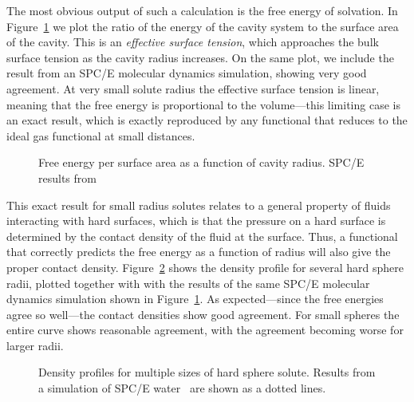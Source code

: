 \documentclass[letterpaper,twocolumn,amsmath,amssymb,prb]{revtex4-1}
\begin{document}
The most obvious output of such a calculation is the free energy of
solvation.  In Figure~\ref{fig:surfaceTension} we plot the ratio of the
energy of the cavity system to the surface area of the cavity.  This
is an \emph{effective surface tension}, which approaches the bulk
surface tension as the cavity radius increases.  On the same plot, we
include the result from an SPC/E molecular dynamics
simulation\cite{huang2001shs}, showing very good agreement.  At very
small solute radius the effective surface tension is linear, meaning
that the free energy is proportional to the volume---this limiting
case is an exact result, which is exactly reproduced by any functional
that reduces to the ideal gas functional at small distances.

\begin{figure}
\begin{center}
\end{center}
\caption{Free energy per surface area as a function of cavity
  radius. SPC/E results from~\cite{huang2001shs}}
\label{fig:surfaceTension}
\end{figure}

This exact result for small radius solutes relates to a general property of
fluids interacting with hard surfaces, which is that the pressure on a hard
surface is determined by the contact density of the fluid at the surface.
Thus, a functional that correctly predicts the free energy as a function of
radius will also give the proper contact density.
Figure~\ref{fig:cavities} shows the density profile for several hard sphere
radii, plotted together with with the results of the same SPC/E molecular
dynamics simulation shown in
Figure~\ref{fig:surfaceTension}\cite{huang2001shs}.  As expected---since
the free energies agree so well---the contact densities show good
agreement.  For small spheres the entire curve shows reasonable agreement,
with the agreement becoming worse for larger radii.

\begin{figure}[b]
\begin{center}
\end{center}
\caption{Density profiles for multiple sizes of hard sphere solute.
  Results from a simulation of SPC/E water~\cite{huang2001shs} are
  shown as a dotted lines.}
\label{fig:cavities}
\end{figure}
\end{document}
